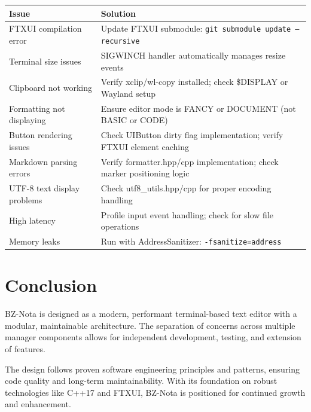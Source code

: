 \documentclass[12pt,a4paper,oneside,openany]{report}
\begin{document}
\begin{table}[H]
	\centering
	\begin{tabular}{|p{4cm}|p{7cm}|}
		\hline
		\textbf{Issue}              & \textbf{Solution}                                                       \\
		\hline
		FTXUI compilation error     & Update FTXUI submodule: \texttt{git submodule update --recursive}       \\
		\hline
		Terminal size issues        & SIGWINCH handler automatically manages resize events                    \\
		\hline
		Clipboard not working       & Verify xclip/wl-copy installed; check \$DISPLAY or Wayland setup        \\
		\hline
		Formatting not displaying   & Ensure editor mode is FANCY or DOCUMENT (not BASIC or CODE)             \\
		\hline
		Button rendering issues     & Check UIButton dirty flag implementation; verify FTXUI element caching  \\
		\hline
		Markdown parsing errors     & Verify formatter.hpp/cpp implementation; check marker positioning logic \\
		\hline
		UTF-8 text display problems & Check utf8\_utils.hpp/cpp for proper encoding handling                  \\
		\hline
		High latency                & Profile input event handling; check for slow file operations            \\
		\hline
		Memory leaks                & Run with AddressSanitizer: \texttt{-fsanitize=address}                  \\
		\hline
	\end{tabular}
\end{table}

\chapter*{Conclusion}

BZ-Nota is designed as a modern, performant terminal-based text editor with a modular, maintainable architecture. The separation of concerns across multiple manager components allows for independent development, testing, and extension of features.

The design follows proven software engineering principles and patterns, ensuring code quality and long-term maintainability. With its foundation on robust technologies like C++17 and FTXUI, BZ-Nota is positioned for continued growth and enhancement.
\end{document}

